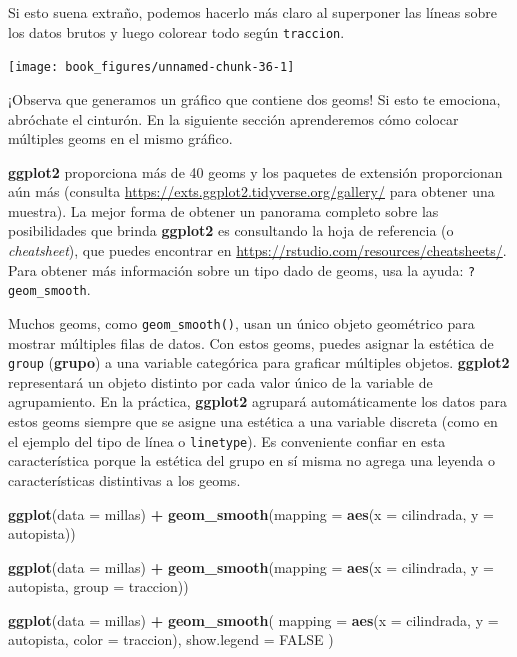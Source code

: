 \documentclass[11pt,oneside]{report}
\newenvironment{Shaded}{\begin{snugshade}}{\end{snugshade}}
\newcommand{\DataTypeTok}[1]{\textcolor[rgb]{0.13,0.29,0.53}{#1}}
\newcommand{\KeywordTok}[1]{\textcolor[rgb]{0.13,0.29,0.53}{\textbf{#1}}}
\newcommand{\NormalTok}[1]{#1}
\newcommand{\OperatorTok}[1]{\textcolor[rgb]{0.81,0.36,0.00}{\textbf{#1}}}
\newcommand{\OtherTok}[1]{\textcolor[rgb]{0.56,0.35,0.01}{#1}}
\newcommand{\StringTok}[1]{\textcolor[rgb]{0.31,0.60,0.02}{#1}}
\begin{document}
Si esto suena extraño, podemos hacerlo más claro al superponer las
líneas sobre los datos brutos y luego colorear todo según
\texttt{traccion}.

\begin{center}\texttt{[image: book\_figures/unnamed-chunk-36-1]} \end{center}

¡Observa que generamos un gráfico que contiene dos geoms! Si esto te
emociona, abróchate el cinturón. En la siguiente sección aprenderemos
cómo colocar múltiples geoms en el mismo gráfico.

\textbf{ggplot2} proporciona más de 40 geoms y los paquetes de extensión
proporcionan aún más (consulta
\url{https://exts.ggplot2.tidyverse.org/gallery/} para obtener una
muestra). La mejor forma de obtener un panorama completo sobre las
posibilidades que brinda \textbf{ggplot2} es consultando la hoja de
referencia (o \emph{cheatsheet}), que puedes encontrar en
\url{https://rstudio.com/resources/cheatsheets/}. Para obtener más
información sobre un tipo dado de geoms, usa la ayuda:
\texttt{?geom\_smooth}.

Muchos geoms, como \texttt{geom\_smooth()}, usan un único objeto
geométrico para mostrar múltiples filas de datos. Con estos geoms,
puedes asignar la estética de \texttt{group} (\textbf{grupo}) a una
variable categórica para graficar múltiples objetos. \textbf{ggplot2}
representará un objeto distinto por cada valor único de la variable de
agrupamiento. En la práctica, \textbf{ggplot2} agrupará automáticamente
los datos para estos geoms siempre que se asigne una estética a una
variable discreta (como en el ejemplo del tipo de línea o
\texttt{linetype}). Es conveniente confiar en esta característica porque
la estética del grupo en sí misma no agrega una leyenda o
características distintivas a los geoms.

\begin{Shaded}
\begin{Highlighting}[]
\KeywordTok{ggplot}\NormalTok{(}\DataTypeTok{data =}\NormalTok{ millas) }\OperatorTok{+}
\StringTok{  }\KeywordTok{geom_smooth}\NormalTok{(}\DataTypeTok{mapping =} \KeywordTok{aes}\NormalTok{(}\DataTypeTok{x =}\NormalTok{ cilindrada, }\DataTypeTok{y =}\NormalTok{ autopista))}

\KeywordTok{ggplot}\NormalTok{(}\DataTypeTok{data =}\NormalTok{ millas) }\OperatorTok{+}
\StringTok{  }\KeywordTok{geom_smooth}\NormalTok{(}\DataTypeTok{mapping =} \KeywordTok{aes}\NormalTok{(}\DataTypeTok{x =}\NormalTok{ cilindrada, }\DataTypeTok{y =}\NormalTok{ autopista, }\DataTypeTok{group =}\NormalTok{ traccion))}

\KeywordTok{ggplot}\NormalTok{(}\DataTypeTok{data =}\NormalTok{ millas) }\OperatorTok{+}
\StringTok{  }\KeywordTok{geom_smooth}\NormalTok{(}
    \DataTypeTok{mapping =} \KeywordTok{aes}\NormalTok{(}\DataTypeTok{x =}\NormalTok{ cilindrada, }\DataTypeTok{y =}\NormalTok{ autopista, }\DataTypeTok{color =}\NormalTok{ traccion),}
    \DataTypeTok{show.legend =} \OtherTok{FALSE}
\NormalTok{    )}
\end{Highlighting}
\end{Shaded}
\end{document}
